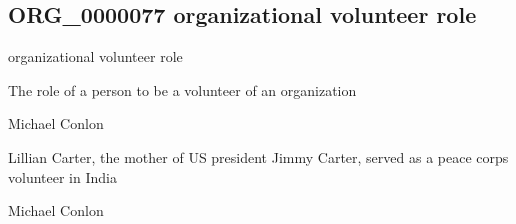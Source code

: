 \documentclass[letterpaper,10pt,english]{sphinxmanual}
\begin{document}
\subsection{ORG\_0000077 \sphinxhyphen{} organizational volunteer role}
\label{\detokenize{doc-ORG_0000077:org-0000077-organizational-volunteer-role}}\label{\detokenize{doc-ORG_0000077:index-0}}\label{\detokenize{doc-ORG_0000077::doc}}
\begin{sphinxShadowBox}

\sphinxAtStartPar
organizational volunteer role
\end{sphinxShadowBox}

\begin{sphinxShadowBox}

\sphinxAtStartPar
{\hyperref[\detokenize{doc-BFO_0000023::doc}]{}}
\end{sphinxShadowBox}

\begin{sphinxShadowBox}

\sphinxAtStartPar
The role of a person to be a volunteer of an organization
\end{sphinxShadowBox}

\begin{sphinxShadowBox}

\sphinxAtStartPar
Michael Conlon 
\end{sphinxShadowBox}

\begin{sphinxShadowBox}

\sphinxAtStartPar
Lillian Carter, the mother of US president Jimmy Carter, served as a peace corps volunteer in India
\end{sphinxShadowBox}

\begin{sphinxShadowBox}

\sphinxAtStartPar
Michael Conlon 
\end{sphinxShadowBox}
\begin{quote}

\ignorespaces \end{quote}
\end{document}
